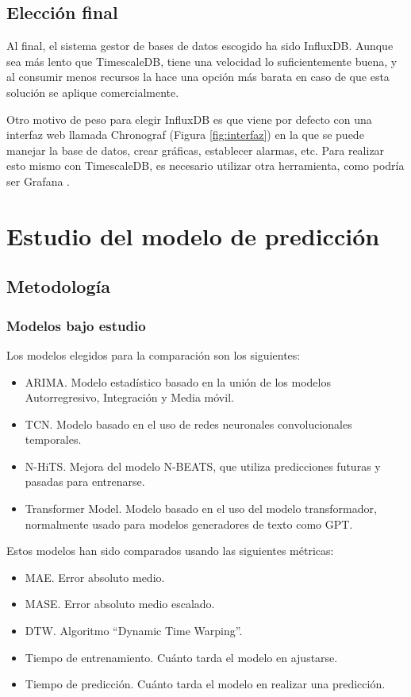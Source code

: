 \subsection{Elección final}

Al final, el sistema gestor de bases de datos escogido ha sido InfluxDB. Aunque sea más lento que TimescaleDB, tiene
una velocidad lo suficientemente buena, y al consumir menos recursos la hace una opción más barata en caso de que 
esta solución se aplique comercialmente.

Otro motivo de peso para elegir InfluxDB es que viene por defecto con una interfaz web llamada Chronograf 
(Figura \ref{fig:interfaz}) en la que se puede manejar la base de datos, crear gráficas, establecer alarmas, etc. 
Para realizar esto mismo con TimescaleDB, es necesario utilizar otra herramienta, como podría ser Grafana \cite{Web:Grafana:Docs}.


\section{Estudio del modelo de predicción}

\subsection{Metodología}

\subsubsection{Modelos bajo estudio}

Los modelos elegidos para la comparación son los siguientes:
\begin{itemize}
    \item ARIMA. Modelo estadístico basado en la unión de los modelos Autorregresivo, Integración y Media móvil.
    \item TCN. Modelo basado en el uso de redes neuronales convolucionales temporales.
    \item N-HiTS. Mejora del modelo N-BEATS, que utiliza predicciones futuras y pasadas para entrenarse.
    \item Transformer Model. Modelo basado en el uso del modelo transformador, normalmente usado para modelos generadores de texto como GPT.
\end{itemize}

Estos modelos han sido comparados usando las siguientes métricas:
\begin{itemize}
    \item MAE. Error absoluto medio.
    \item MASE. Error absoluto medio escalado.
    \item DTW. Algoritmo ``Dynamic Time Warping''.
    \item Tiempo de entrenamiento. Cuánto tarda el modelo en ajustarse.
    \item Tiempo de predicción. Cuánto tarda el modelo en realizar una predicción.
\end{itemize}

